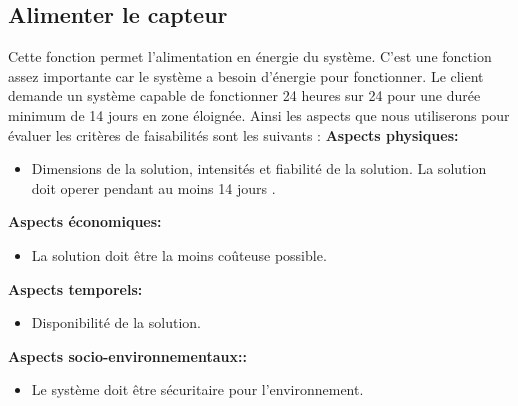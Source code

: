 \begin{table}[!htb]
\footnotesize
\centering
{}
\caption{Évaluation globale des concepts pour capter les informations sur les poissons}
\label{t:Decision_capteur}
\end{table}

\subsection{Alimenter le capteur}
 Cette fonction permet l'alimentation en énergie du système. C'est une fonction assez importante car le système a besoin d'énergie pour fonctionner. Le client demande un système capable de fonctionner 24 heures sur 24 pour une durée minimum de 14 jours en zone éloignée. Ainsi les aspects que nous utiliserons pour évaluer les critères de faisabilités sont les suivants : 
 \textbf{Aspects physiques:}
 \begin{itemize} [label = {--}]
    \item Dimensions de la solution, intensités et fiabilité de  la solution. La solution doit operer pendant au moins 14 jours .
\end{itemize}
 \textbf{Aspects économiques:}
 \begin{itemize} [label = {--}]
    \item La solution doit être la moins coûteuse possible.
\end{itemize}
 \textbf{Aspects temporels:}
 \begin{itemize} [label = {--}]
    \item Disponibilité de la solution.
\end{itemize}
 \textbf{Aspects socio-environnementaux::}
 \begin{itemize} [label = {--}]
    \item Le système doit être sécuritaire pour l'environnement.
\end{itemize}
